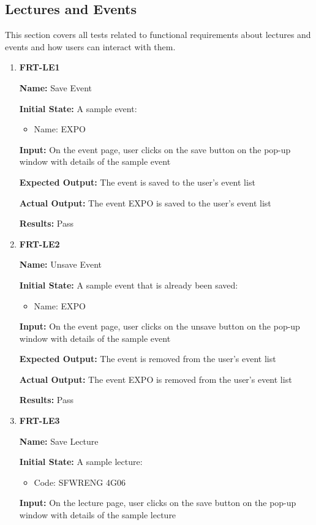 \documentclass[12pt, titlepage]{article}
\begin{document}
\subsection{Lectures and Events}
This section covers all tests related to functional requirements about lectures and events and how users can interact with them.
\begin{enumerate}
\item \textbf{FRT-LE1}

\textbf{Name:} Save Event

\textbf{Initial State:} A sample event:
\begin{itemize}
\item Name: EXPO
\end{itemize}

\textbf{Input:} On the event page, user clicks on the save button on the pop-up window with details of the sample event
					
\textbf{Expected Output:} The event is saved to the user's event list

\textbf{Actual Output:} The event EXPO is saved to the user's event list

\textbf{Results:} Pass

\item \textbf{FRT-LE2}

\textbf{Name:} Unsave Event

\textbf{Initial State:} A sample event that is already been saved:
\begin{itemize}
\item Name: EXPO
\end{itemize}

\textbf{Input:} On the event page, user clicks on the unsave button on the pop-up window with details of the sample event
					
\textbf{Expected Output:} The event is removed from the user's event list

\textbf{Actual Output:} The event EXPO is removed from the user's event list

\textbf{Results:} Pass

\item \textbf{FRT-LE3}

\textbf{Name:} Save Lecture

\textbf{Initial State:} A sample lecture:
\begin{itemize}
\item Code: SFWRENG 4G06
\end{itemize}

\textbf{Input:} On the lecture page, user clicks on the save button on the pop-up window with details of the sample lecture
					

\end{enumerate}
\end{document}
